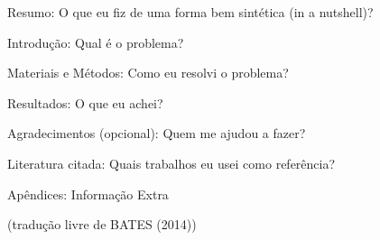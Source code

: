 \documentclass[
12pt,		%
openright,	%
twoside,  %
a4paper,			%
chapter=TITLE,		%
english,			%
french,				%
spanish,			%
brazil				%
]{USPSC-classe/USPSC_RedarTex}
\begin{document}
\begin{alineas}
\item Resumo: O que eu fiz de uma forma bem sint\'etica (\textquotedbl in a nutshell\textquotedbl )?
\item Introdu\c{c}\~ao: Qual \'e o problema?
\item Materiais e M\'etodos: Como eu resolvi o problema?
\item Resultados: O que eu achei?
\item Agradecimentos (opcional): Quem me ajudou a fazer?
\item Literatura citada: Quais trabalhos eu usei como refer\^encia?
\item Ap\^endices: Informa\c{c}\~ao Extra
\end{alineas}

\begin{flushright}
\setlength{\absparsep}{0pt}
\tiny \begin{flushright}
\setlength{\absparsep}{0pt}
\tiny \begin{flushright}
\setlength{\absparsep}{0pt}
\tiny \begin{flushright}
\setlength{\absparsep}{0pt}
\tiny \begin{flushright}
\setlength{\absparsep}{0pt}
\tiny \begin{flushright}
\setlength{\absparsep}{0pt}
\tiny \begin{flushright}
\setlength{\absparsep}{0pt}
\tiny \begin{flushright}
\setlength{\absparsep}{0pt}
\tiny \begin{flushright}
\setlength{\absparsep}{0pt}
\tiny \begin{flushright}
\setlength{\absparsep}{0pt}
\tiny (tradu\c{c}\~ao livre de BATES (2014)) \normalsize 
\end{flushright}

 \normalsize 
\end{flushright}

 \normalsize 
\end{flushright}

 \normalsize 
\end{flushright}

 \normalsize 
\end{flushright}

 \normalsize 
\end{flushright}

 \normalsize 
\end{flushright}

 \normalsize 
\end{flushright}

 \normalsize 
\end{flushright}

 \normalsize 
\end{flushright}
\end{document}
